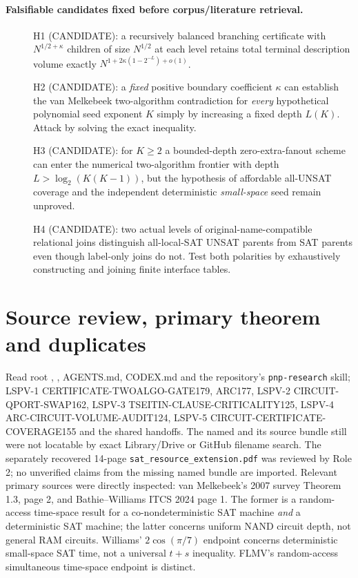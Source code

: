 \documentclass[11pt]{article}
\begin{document}
\paragraph{Falsifiable candidates fixed before corpus/literature retrieval.}
\begin{description}
\item[] H1 (CANDIDATE): a recursively balanced branching certificate with
$N^{1/2+\kappa}$ children of size $N^{1/2}$ at each level retains total
terminal description volume exactly $N^{1+2\kappa(1-2^{-L})+o(1)}$.
\item[] H2 (CANDIDATE): a \emph{fixed} positive boundary coefficient
$\kappa$ can establish the van Melkebeek two-algorithm contradiction for
\emph{every} hypothetical polynomial seed exponent $K$ simply by
increasing a fixed depth $L(K)$. Attack by solving the exact inequality.
\item[] H3 (CANDIDATE): for $K\ge2$ a bounded-depth zero-extra-fanout
scheme can enter the numerical two-algorithm frontier with depth
$L>\log_2(K(K-1))$, but the hypothesis of affordable all-UNSAT
coverage and the independent deterministic \emph{small-space} seed
remain unproved.
\item[] H4 (CANDIDATE): two actual levels of original-name-compatible
relational joins distinguish all-local-SAT UNSAT parents from SAT
parents even though label-only joins do not. Test both polarities by
exhaustively constructing and joining finite interface tables.
\end{description}

\section{Source review, primary theorem and duplicates}
Read root , , AGENTS.md, CODEX.md and the
repository's \texttt{pnp-research} skill; LSPV-1
CERTIFICATE-TWOALGO-GATE179, ARC177, LSPV-2 CIRCUIT-QPORT-SWAP162,
LSPV-3 TSEITIN-CLAUSE-CRITICALITY125, LSPV-4
ARC-CIRCUIT-VOLUME-AUDIT124, LSPV-5
CIRCUIT-CERTIFICATE-COVERAGE155 and the shared handoffs.
The named  and its source
bundle still were not locatable by exact Library/Drive or GitHub filename
search. The separately recovered 14-page \texttt{sat\_resource\_extension.pdf}
was reviewed by Role 2; no unverified claims from the missing named bundle
are imported. Relevant primary sources were directly inspected:
van Melkebeek's 2007 survey Theorem 1.3, page 2, and Bathie--Williams
ITCS 2024 page 1. The former is a random-access time-space result for
a co-nondeterministic SAT machine \emph{and} a deterministic SAT machine;
the latter concerns uniform NAND circuit depth, not general RAM circuits.
Williams' $2\cos(\pi/7)$ endpoint concerns deterministic small-space
SAT time, not a universal $t+s$ inequality. FLMV's random-access
simultaneous time-space endpoint is distinct.
\end{document}
